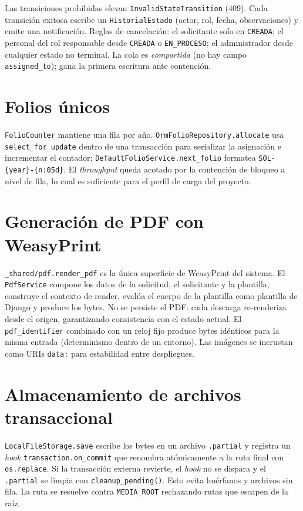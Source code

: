 \documentclass[12pt,letterpaper]{report}
\begin{document}
Las transiciones prohibidas elevan \texttt{InvalidStateTransition} (409). Cada
transición exitosa escribe un \texttt{HistorialEstado} (actor, rol, fecha,
observaciones) y emite una notificación. Reglas de cancelación: el solicitante
solo en \texttt{CREADA}; el personal del rol responsable desde \texttt{CREADA} o
\texttt{EN\_PROCESO}; el administrador desde cualquier estado no terminal. La cola
es \emph{compartida} (no hay campo \texttt{assigned\_to}); gana la primera
escritura ante contención.

\section{Folios únicos}

\texttt{FolioCounter} mantiene una fila por año. \texttt{OrmFolioRepository.allocate}
usa \texttt{select\_for\_update} dentro de una transacción para serializar la
asignación e incrementar el contador; \texttt{DefaultFolioService.next\_folio}
formatea \texttt{SOL-\{year\}-\{n:05d\}}. El \textit{throughput} queda acotado por
la contención de bloqueo a nivel de fila, lo cual es suficiente para el perfil de
carga del proyecto.

\section{Generación de PDF con WeasyPrint}

\texttt{\_shared/pdf.render\_pdf} es la única superficie de WeasyPrint del
sistema. El \texttt{PdfService} compone los datos de la solicitud, el solicitante
y la plantilla, construye el contexto de render, evalúa el cuerpo de la plantilla
como plantilla de Django y produce los bytes. No se persiste el PDF: cada
descarga re-renderiza desde el origen, garantizando consistencia con el estado
actual. El \texttt{pdf\_identifier} combinado con un reloj fijo produce bytes
idénticos para la misma entrada (determinismo dentro de un entorno). Las imágenes
se incrustan como URIs \texttt{data:} para estabilidad entre despliegues.

\section{Almacenamiento de archivos transaccional}

\texttt{LocalFileStorage.save} escribe los bytes en un archivo \texttt{.partial}
y registra un \textit{hook} \texttt{transaction.on\_commit} que renombra
atómicamente a la ruta final con \texttt{os.replace}. Si la transacción externa
revierte, el \textit{hook} no se dispara y el \texttt{.partial} se limpia con
\texttt{cleanup\_pending()}. Esto evita huérfanos y archivos sin fila. La ruta se
resuelve contra \texttt{MEDIA\_ROOT} rechazando rutas que escapen de la raíz.
\end{document}
